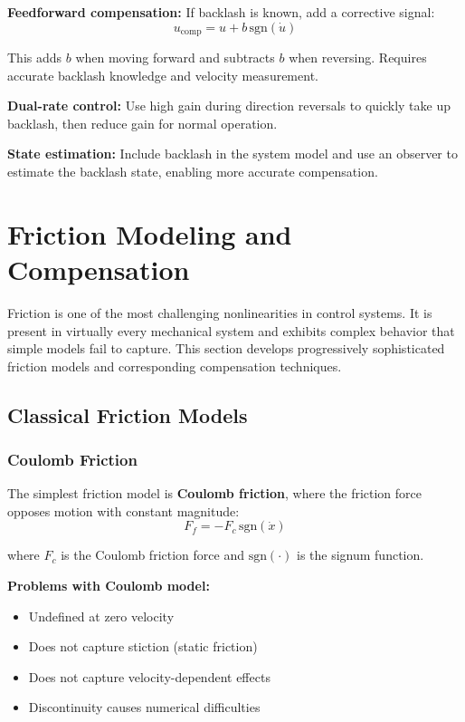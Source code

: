 \textbf{Feedforward compensation:} If backlash is known, add a corrective signal:
\begin{equation}
u_{\text{comp}} = u + b\,\text{sgn}(\dot{u})
\end{equation}

This adds $b$ when moving forward and subtracts $b$ when reversing. Requires accurate backlash knowledge and velocity measurement.

\textbf{Dual-rate control:} Use high gain during direction reversals to quickly take up backlash, then reduce gain for normal operation.

\textbf{State estimation:} Include backlash in the system model and use an observer to estimate the backlash state, enabling more accurate compensation.

\section{Friction Modeling and Compensation}
\label{sec:friction}

Friction is one of the most challenging nonlinearities in control systems. It is present in virtually every mechanical system and exhibits complex behavior that simple models fail to capture. This section develops progressively sophisticated friction models and corresponding compensation techniques.

\subsection{Classical Friction Models}

\subsubsection{Coulomb Friction}

The simplest friction model is \textbf{Coulomb friction}, where the friction force opposes motion with constant magnitude:
\begin{equation}
F_f = -F_c \, \text{sgn}(\dot{x})
\label{eq:coulomb_friction}
\end{equation}

where $F_c$ is the Coulomb friction force and $\text{sgn}(\cdot)$ is the signum function.

\textbf{Problems with Coulomb model:}
\begin{itemize}
    \item Undefined at zero velocity
    \item Does not capture stiction (static friction)
    \item Does not capture velocity-dependent effects
    \item Discontinuity causes numerical difficulties
\end{itemize}

